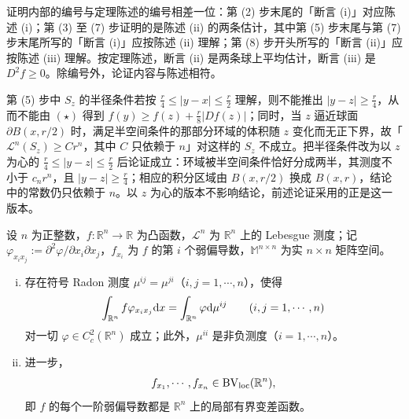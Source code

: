 \documentclass[../../main.tex]{subfiles}%
\begin{document}
\begin{remark}\label{remark:ch06-thm-6-7-编号}
证明内部的编号与定理陈述的编号相差一位：第 (2) 步末尾的「断言 (i)」对应陈述 (i)；第 (3) 至 (7) 步证明的是陈述 (ii) 的两条估计，其中第 (5) 步末尾与第 (7) 步末尾所写的「断言 (i)」应按陈述 (ii) 理解；第 (8) 步开头所写的「断言 (ii)」应按陈述 (iii) 理解。按定理陈述，断言 (ii) 是两条球上平均估计，断言 (iii) 是 $D^{2}f\geqslant0$。除编号外，论证内容与陈述相符。
\end{remark}

\begin{remark}\label{remark:ch06-thm-6-7-环域}
第 (5) 步中 $S_z$ 的半径条件若按 $\frac r4\leqslant\lvert y-x\rvert\leqslant\frac r2$ 理解，则不能推出 $\lvert y-z\rvert\geqslant\frac r4$，从而不能由 $(\star)$ 得到 $f(y)\geqslant f(z)+\frac r8\lvert Df(z)\rvert$；同时，当 $z$ 逼近球面 $\partial B(x,r/2)$ 时，满足半空间条件的那部分环域的体积随 $z$ 变化而无正下界，故「$\mathcal{L}^{n}(S_z)\geqslant Cr^{n}$，其中 $C$ 只依赖于 $n$」对这样的 $S_z$ 不成立。把半径条件改为以 $z$ 为心的 $\frac r4\leqslant\lvert y-z\rvert\leqslant\frac r2$ 后论证成立：环域被半空间条件恰好分成两半，其测度不小于 $c_nr^{n}$，且 $\lvert y-z\rvert\geqslant\frac r4$；相应的积分区域由 $B(x,r/2)$ 换成 $B(x,r)$，结论中的常数仍只依赖于 $n$。以 $z$ 为心的版本不影响结论，前述论证采用的正是这一版本。
\end{remark}

\begin{theorem}[二阶导数作为测度]\label{theorem:ch06-6-8}
设 $n$ 为正整数，$f:\mathbb{R}^n\to\mathbb{R}$ 为凸函数，$\mathcal{L}^{n}$ 为 $\mathbb{R}^n$ 上的 Lebesgue 测度；记 $\varphi_{x_ix_j}:=\partial^{2}\varphi/\partial x_i\partial x_j$，$f_{x_i}$ 为 $f$ 的第 $i$ 个弱偏导数，$\mathbb{M}^{n\times n}$ 为实 $n\times n$ 矩阵空间。
\begin{enumerate}[(i)]
\item 存在符号 Radon 测度 $\mu^{ij}=\mu^{ji}$（$i,j=1,\cdots,n$），使得
\begin{align*}
\int_{\mathbb{R}^n}f\varphi_{x_ix_j}\mathrm{d} x=\int_{\mathbb{R}^n}\varphi\mathrm{d}\mu^{ij}\qquad(i,j=1,\cdots,n)
\end{align*}
对一切 $\varphi\in C_c^{2}(\mathbb{R}^n)$ 成立；此外，$\mu^{ii}$ 是非负测度（$i=1,\cdots,n$）。
\item 进一步，
\begin{align*}
f_{x_1},\cdots,f_{x_n}\in\mathrm{BV}_{\mathrm{loc}}(\mathbb{R}^n),
\end{align*}
即 $f$ 的每个一阶弱偏导数都是 $\mathbb{R}^n$ 上的局部有界变差函数。
\end{enumerate}
\end{theorem}
\end{document}
